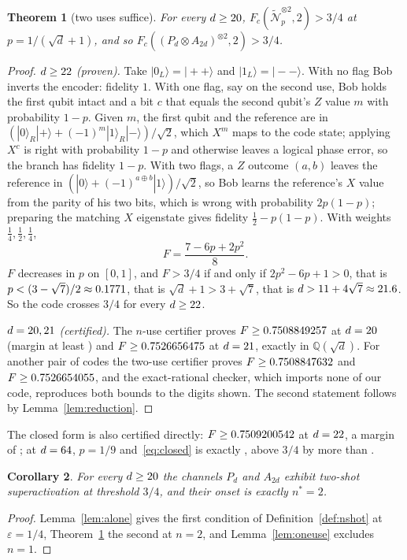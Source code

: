 \documentclass[aps,pra,twocolumn,superscriptaddress,nofootinbib,longbibliography,floatfix]{revtex4-2}
\newtheorem{theorem}{Theorem}
\newtheorem{corollary}[theorem]{Corollary}
\newcommand{\ket}[1]{|#1\rangle}
\newcommand{\nt}{\widetilde{\mathcal N}}
\begin{document}
\begin{theorem}[two uses suffice]
\label{thm:two}
For every $d\ge20$, $F_c(\nt_p^{\otimes2},2)>3/4$ at $p=1/(\sqrt d+1)$, and so $F_c((P_d\otimes A_{2d})^{\otimes2},2)>3/4$.
\end{theorem}
\begin{proof}
\emph{$d\ge22$ (proven).} Take $\ket{0_L}=\ket{++}$ and $\ket{1_L}=\ket{--}$. With no flag Bob inverts the encoder: fidelity $1$. With one flag, say on the second use, Bob holds the first qubit intact and a bit $c$ that equals the second qubit's $Z$ value $m$ with probability $1-p$. Given $m$, the first qubit and the reference are in $(\ket0_R\ket++(-1)^m\ket1_R\ket-)/\sqrt2$, which $X^m$ maps to the code state; applying $X^c$ is right with probability $1-p$ and otherwise leaves a logical phase error, so the branch has fidelity $1-p$. With two flags, a $Z$ outcome $(a,b)$ leaves the reference in $(\ket0+(-1)^{a\oplus b}\ket1)/\sqrt2$, so Bob learns the reference's $X$ value from the parity of his two bits, which is wrong with probability $2p(1-p)$; preparing the matching $X$ eigenstate gives fidelity $\frac12-p(1-p)$. With weights $\frac14,\frac12,\frac14$,
\begin{equation}
\label{eq:closed}
F=\frac{7-6p+2p^2}{8}.
\end{equation}
$F$ decreases in $p$ on $[0,1]$, and $F>3/4$ if and only if $2p^2-6p+1>0$, that is $p<(3-\sqrt7)/2\approx0.1771$, that is $\sqrt d+1>3+\sqrt7$, that is $d>11+4\sqrt7\approx21.6$. So the code crosses $3/4$ for every $d\ge22$.

\emph{$d=20,21$ (certified).} The $n$-use certifier proves $F\ge0.7508849257$ at $d=20$ (margin at least \NuseTwentyMargin) and $F\ge0.7526656475$ at $d=21$, exactly in $\mathbb Q(\sqrt d)$. For another pair of codes the two-use certifier proves $F\ge0.7508847632$ and $F\ge0.7526654055$, and the exact-rational checker, which imports none of our code, reproduces both bounds to the digits shown. The second statement follows by Lemma~\ref{lem:reduction}.
\end{proof}
\noindent The closed form is also certified directly: $F\ge0.7509200542$ at $d=22$, a margin of \ClosedTwentyTwoMargin; at $d=64$, $p=1/9$ and~\eqref{eq:closed} is exactly \ClosedSixtyFourFrac, above $3/4$ by more than \ClosedSixtyFourMargin.

\begin{corollary}
\label{cor:exact}
For every $d\ge20$ the channels $P_d$ and $A_{2d}$ exhibit two-shot superactivation at threshold $3/4$, and their onset is exactly $n^*=2$.
\end{corollary}
\begin{proof}
Lemma~\ref{lem:alone} gives the first condition of Definition~\ref{def:nshot} at $\varepsilon=1/4$, Theorem~\ref{thm:two} the second at $n=2$, and Lemma~\ref{lem:oneuse} excludes $n=1$.
\end{proof}
\end{document}

